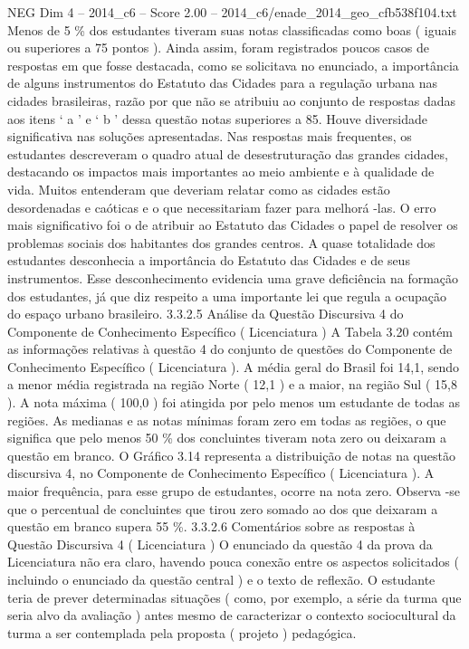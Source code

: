 \begin{textsample}{NEG Dim 4 – 2014\_c6 – Score 2.00 – 2014\_c6/enade\_2014\_geo\_cfb538f104.txt}
Menos de 5 \% dos estudantes tiveram suas notas classificadas como boas ( iguais ou superiores a 75 pontos ).
Ainda assim, foram registrados poucos casos de respostas em que fosse destacada, como se solicitava no enunciado, a importância de alguns instrumentos do Estatuto das Cidades para a regulação urbana nas cidades brasileiras, razão por que não se atribuiu ao conjunto de respostas dadas aos itens ‘ a ’ e ‘ b ’ dessa questão notas superiores a 85.
Houve diversidade significativa nas soluções apresentadas.
Nas respostas mais frequentes, os estudantes descreveram o quadro atual de desestruturação das grandes cidades, destacando os impactos mais importantes ao meio ambiente e à qualidade de vida.
Muitos entenderam que deveriam relatar como as cidades estão desordenadas e caóticas e o que necessitariam fazer para melhorá -las.
O erro mais significativo foi o de atribuir ao Estatuto das Cidades o papel de resolver os problemas sociais dos habitantes dos grandes centros.
A quase totalidade dos estudantes desconhecia a importância do Estatuto das Cidades e de seus instrumentos.
Esse desconhecimento evidencia uma grave deficiência na formação dos estudantes, já que diz respeito a uma importante lei que regula a ocupação do espaço urbano brasileiro. 3.3.2.5 Análise da Questão Discursiva 4 do Componente de Conhecimento Específico ( Licenciatura ) A Tabela 3.20 contém as informações relativas à questão 4 do conjunto de questões do Componente de Conhecimento Específico ( Licenciatura ).
A média geral do Brasil foi 14,1, sendo a menor média registrada na região Norte ( 12,1 ) e a maior, na região Sul ( 15,8 ).
A nota máxima ( 100,0 ) foi atingida por pelo menos um estudante de todas as regiões.
As medianas e as notas mínimas foram zero em todas as regiões, o que significa que pelo menos 50 \% dos concluintes tiveram nota zero ou deixaram a questão em branco.
O Gráfico 3.14 representa a distribuição de notas na questão discursiva 4, no Componente de Conhecimento Específico ( Licenciatura ).
A maior frequência, para esse grupo de estudantes, ocorre na nota zero.
Observa -se que o percentual de concluintes que tirou zero somado ao dos que deixaram a questão em branco supera 55 \%. 3.3.2.6 Comentários sobre as respostas à Questão Discursiva 4 ( Licenciatura ) O enunciado da questão 4 da prova da Licenciatura não era claro, havendo pouca conexão entre os aspectos solicitados ( incluindo o enunciado da questão central ) e o texto de reflexão.
O estudante teria de prever determinadas situações ( como, por exemplo, a série da turma que seria alvo da avaliação ) antes mesmo de caracterizar o contexto sociocultural da turma a ser contemplada pela proposta ( projeto ) pedagógica.

\end{textsample}
